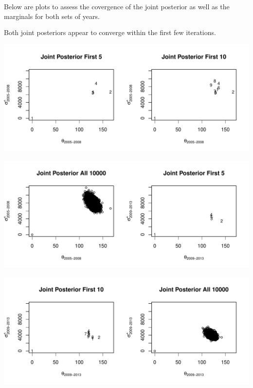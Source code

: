 \documentclass{article}\usepackage[]{graphicx}\usepackage[]{color}
\makeatletter
\def\maxwidth{ %
  \ifdim\Gin@nat@width>\linewidth
    \linewidth
  \else
    \Gin@nat@width
  \fi
}
\newenvironment{knitrout}{}{} %
\makeatother
\begin{document}
\begin{enumerate}
\begin{enumerate}
Below are plots to assess the covergence of the joint posterior as well as the marginals for both sets of years.

Both joint posteriors appear to converge within the first few iterations.

\begin{knitrout}
\color{fgcolor}

{\centering \includegraphics[width=\maxwidth]{figure/prob3b-1} 

}




{\centering \includegraphics[width=\maxwidth]{figure/prob3b-2} 

}




{\centering \includegraphics[width=\maxwidth]{figure/prob3b-3} 

}
\end{knitrout}
\end{enumerate}
\end{enumerate}
\end{document}
